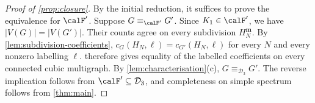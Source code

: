 \begin{proof}[Proof of \cref{prop:closure}]
By the initial reduction, it suffices to prove the equivalence for $\calF'$.
Suppose $G\equiv_{\calF'}G'$. Since $K_1\in\calF'$, we have
$|V(G)|=|V(G')|$.
Their counts agree on every subdivision $H_N^{\mathbf m}$.
By \cref{lem:subdivision-coefficients},
$c_G(H_N,\ell)=c_{G'}(H_N,\ell)$ for every $N$ and every nonzero labelling $\ell$.
 therefore gives equality of the labelled
coefficients on every connected cubic multigraph. By \cref{lem:characterisation}(c),
$G\equiv_{\mathcal D_3}G'$.
The reverse implication follows from $\calF'\subseteq\mathcal D_3$,
and completeness on simple spectrum follows from \cref{thm:main}.
\end{proof}
